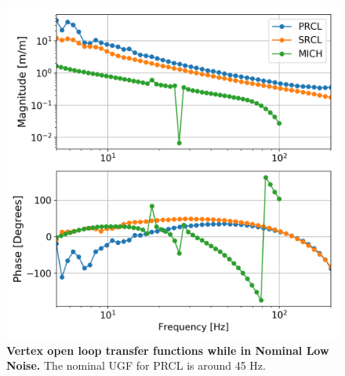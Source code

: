 	\begin{figure}[!]
		\centering
		\includegraphics[width=0.75 \textwidth]{../Figures/MeasuredVertexOLF.png}
		\caption[Vertex open loop transfer functions while in Nominal Low Noise.]  
		{\textbf{Vertex open loop transfer functions while in Nominal Low Noise.}
			The nominal UGF for PRCL is around 45 Hz.
		}
		\label{fig:vertex_OLTF}
	\end{figure}
	

